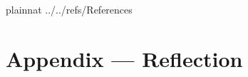 \documentclass[12pt]{article}
\begin{document}



\newpage

 {plainnat}
 {../../refs/References}

\newpage

\section*{Appendix --- Reflection}
\end{document}
